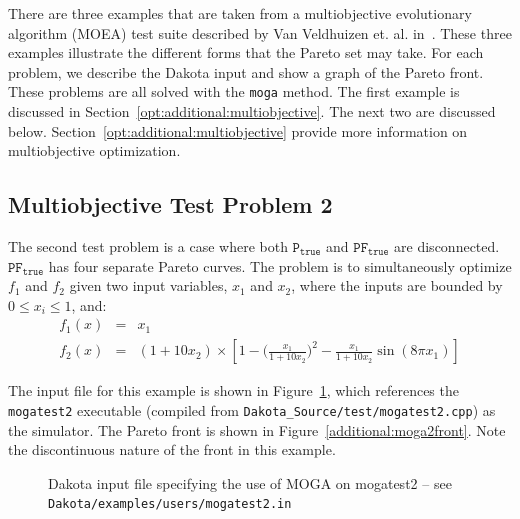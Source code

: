 There are three examples that are taken from a multiobjective
evolutionary algorithm (MOEA) test suite described by Van Veldhuizen
et. al. in~\cite{Coe02}. These three examples illustrate the different
forms that the Pareto set may take. For each problem, we describe the
Dakota input and show a graph of the Pareto front. These problems are
all solved with the \texttt{moga} method.  The first example is
discussed in Section~\ref{opt:additional:multiobjective}.  The next
two are discussed below.  Section~\ref{opt:additional:multiobjective}
provide more information on multiobjective optimization.

\subsection{Multiobjective Test Problem 2}\label{additional:multiobjective:problem2}

The second test problem is a case where both $\mathtt{P_{true}}$ and
$\mathtt{PF_{true}}$ are disconnected. $\mathtt{PF_{true}}$ has four
separate Pareto curves. The problem is to simultaneously optimize
$f_1$ and $f_2$ given two input variables, $x_1$ and $x_2$,
where the inputs are bounded by $0 \leq x_{i} \leq 1$, and:
\begin{eqnarray*}
f_1(x) &=& x_1 \\
f_2(x) &=& (1+10x_2) \times \left[1-\bigg(\frac{x_1}{1+10x_2}\bigg)^2-
\frac{x_1}{1+10x_2}\sin(8\pi x_1)\right]
\end{eqnarray*}

The input file for this example is shown in
Figure~\ref{additional:moga2inp}, which references the
\texttt{mogatest2} executable (compiled from
\texttt{Dakota\_Source/test/mogatest2.cpp}) as the simulator. The Pareto
front is shown in Figure~\ref{additional:moga2front}. Note the
discontinuous nature of the front in this example.

\begin{figure}
  \centering
  \begin{bigbox}
    \begin{small}
    \end{small}
  \end{bigbox}
  \caption{Dakota input file specifying the use of MOGA on mogatest2 --
see \texttt{Dakota/examples/users/mogatest2.in} }
  \label{additional:moga2inp}
\end{figure}

